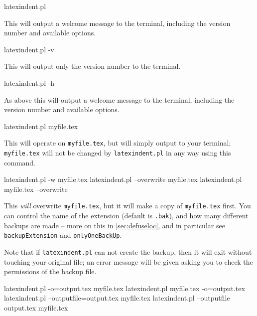 	\begin{commandshell}
latexindent.pl
      \end{commandshell}

	This will output a welcome message to the terminal, including the version number
	and available options.

	\begin{commandshell}
latexindent.pl -v
      \end{commandshell}
	This will output only the version number to the terminal.


	\begin{commandshell}
latexindent.pl -h
      \end{commandshell}

	As above this will output a welcome message to the terminal, including the version number
	and available options.
	\begin{commandshell}
latexindent.pl myfile.tex
      \end{commandshell}

	This will operate on \texttt{myfile.tex}, but will simply output to your terminal; \texttt{myfile.tex} will	not be changed
	by \texttt{latexindent.pl} in any way using this command.

	\begin{commandshell}
latexindent.pl -w myfile.tex
latexindent.pl --overwrite myfile.tex
latexindent.pl myfile.tex --overwrite 
      \end{commandshell}

	This \emph{will} overwrite \texttt{myfile.tex}, but it will
	make a copy of \texttt{myfile.tex} first. You can control the name of
	the extension (default is \texttt{.bak}), and how many different backups are made --
	more on this in \cref{sec:defuseloc}, and in particular see \texttt{backupExtension} and \texttt{onlyOneBackUp}.

	Note that if \texttt{latexindent.pl} can not create the backup, then it
	will exit without touching your original file; an error message will be given
	asking you to check the permissions of the backup file.

	\begin{commandshell} 
latexindent.pl -o=output.tex myfile.tex
latexindent.pl myfile.tex -o=output.tex 
latexindent.pl --outputfile=output.tex myfile.tex
latexindent.pl --outputfile output.tex myfile.tex
      \end{commandshell}

